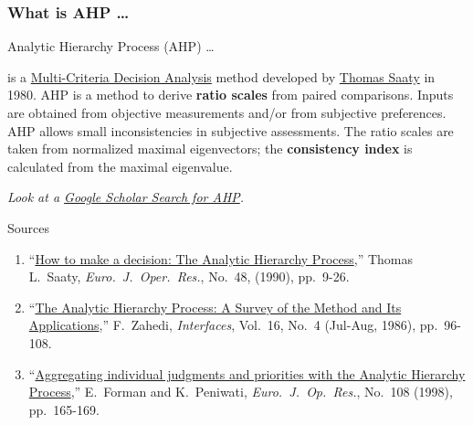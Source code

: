 \documentclass[10pt,handout,hyperref={colorlinks=true,linkcolor=blue,citecolor=citelink,urlcolor=gray}]{beamer}
\newcounter{e_temp}
\begin{document}
\begin{frame}[label=defn]
\frametitle{What is AHP \dots}
\vspace{-1ex}
\begin{block}{Analytic Hierarchy Process (AHP) \dots} 
\vspace{1ex}
\parbox{\textwidth}{is a \href{http://en.wikipedia.org/wiki/Multiple-criteria_decision_analysis}{Multi-Criteria Decision Analysis} method developed by \href{http://en.wikipedia.org/wiki/Thomas_L._Saaty}{Thomas Saaty} in 1980. AHP is a method to derive \textbf{ratio scales} from paired comparisons. Inputs are obtained from objective measurements and/or from subjective preferences. AHP allows small inconsistencies in subjective assessments. The ratio scales are taken from normalized maximal eigenvectors; the \textbf{consistency index} is calculated from the maximal eigenvalue.}
\vspace{0.5ex}
\pause

{\footnotesize\emph{Look at a \href{http://scholar.google.com/scholar?q=Analytic+Hierarchy+Process}{Google Scholar Search for AHP}.}}
\end{block}
\pause

\begin{block}{Sources{\normalsize\footnotemark}}
\scriptsize
\begin{enumerate}
\item ``\href{http://www.sbuf.se/ProjectArea/Documents/ProjectDocuments/06F167EF-B243-48ED-8C45-F7466B3136EB\%5CWebPublishings\%5CHow\%20to\%20make\%20decision\%20AHP.pdf}{How to make a decision: The Analytic Hierarchy Process},'' Thomas L.~Saaty, \emph{Euro.~J.~Oper.~Res.}, No.~48, (1990), pp.~9-26.
\item ``\href{http://www.jstor.org/stable/25060854}{The Analytic Hierarchy Process: A Survey of the Method and Its Applications},'' F.~Zahedi, \emph{Interfaces}, Vol.~16, No.~4 (Jul-Aug, 1986), pp.~96-108.
\item ``\href{http://ac.els-cdn.com/S0377221797002440/1-s2.0-S0377221797002440-main.pdf?_tid=4df46d5a-a791-11e3-a782-00000aacb35f&acdnat=1394373007_f9c271d60f1947ad5dec7236ffa1cd8d}{Aggregating individual judgments and priorities with the Analytic Hierarchy Process},'' E.~Forman and K.~Peniwati, \emph{Euro.~J.~Op.~Res.}, No.~108 (1998), pp.~165-169.
\end{enumerate}
\end{block}
\end{frame}
\end{document}
